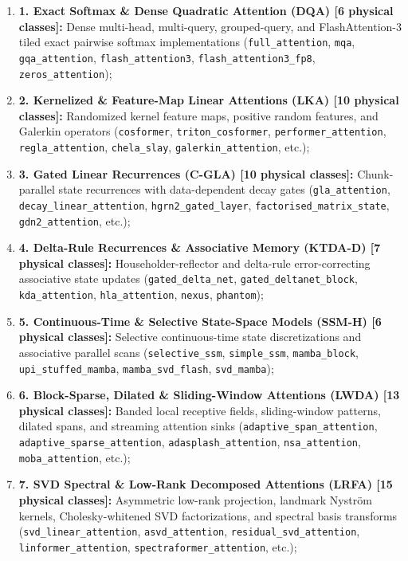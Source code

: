 \begin{enumerate}
    \item \textbf{1. Exact Softmax \& Dense Quadratic Attention (DQA) [6 physical classes]:} Dense multi-head, multi-query, grouped-query, and FlashAttention-3 tiled exact pairwise softmax implementations (\texttt{full\_attention}, \texttt{mqa}, \texttt{gqa\_attention}, \texttt{flash\_attention3}, \texttt{flash\_attention3\_fp8}, \texttt{zeros\_attention});
    \item \textbf{2. Kernelized \& Feature-Map Linear Attentions (LKA) [10 physical classes]:} Randomized kernel feature maps, positive random features, and Galerkin operators (\texttt{cosformer}, \texttt{triton\_cosformer}, \texttt{performer\_attention}, \texttt{regla\_attention}, \texttt{chela\_slay}, \texttt{galerkin\_attention}, etc.);
    \item \textbf{3. Gated Linear Recurrences (C-GLA) [10 physical classes]:} Chunk-parallel state recurrences with data-dependent decay gates (\texttt{gla\_attention}, \texttt{decay\_linear\_attention}, \texttt{hgrn2\_gated\_layer}, \texttt{factorised\_matrix\_state}, \texttt{gdn2\_attention}, etc.);
    \item \textbf{4. Delta-Rule Recurrences \& Associative Memory (KTDA-D) [7 physical classes]:} Householder-reflector and delta-rule error-correcting associative state updates (\texttt{gated\_delta\_net}, \texttt{gated\_deltanet\_block}, \texttt{kda\_attention}, \texttt{hla\_attention}, \texttt{nexus}, \texttt{phantom});
    \item \textbf{5. Continuous-Time \& Selective State-Space Models (SSM-H) [6 physical classes]:} Selective continuous-time state discretizations and associative parallel scans (\texttt{selective\_ssm}, \texttt{simple\_ssm}, \texttt{mamba\_block}, \texttt{upi\_stuffed\_mamba}, \texttt{mamba\_svd\_flash}, \texttt{svd\_mamba});
    \item \textbf{6. Block-Sparse, Dilated \& Sliding-Window Attentions (LWDA) [13 physical classes]:} Banded local receptive fields, sliding-window patterns, dilated spans, and streaming attention sinks (\texttt{adaptive\_span\_attention}, \texttt{adaptive\_sparse\_attention}, \texttt{adasplash\_attention}, \texttt{nsa\_attention}, \texttt{moba\_attention}, etc.);
    \item \textbf{7. SVD Spectral \& Low-Rank Decomposed Attentions (LRFA) [15 physical classes]:} Asymmetric low-rank projection, landmark Nystr\"om kernels, Cholesky-whitened SVD factorizations, and spectral basis transforms (\texttt{svd\_linear\_attention}, \texttt{asvd\_attention}, \texttt{residual\_svd\_attention}, \texttt{linformer\_attention}, \texttt{spectraformer\_attention}, etc.);

\end{enumerate}
